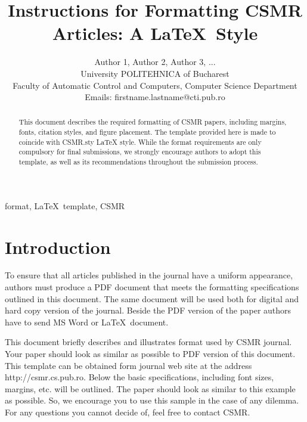 \documentclass[twoside, 11pt, a4paper]{article}
\begin{document}
\title{Instructions for Formatting CSMR Articles: A \LaTeX\ Style}

\author{\name Author 1, Author 2, Author 3, ...\\
       \addr University POLITEHNICA of Bucharest\\
       Faculty of Automatic Control and Computers, Computer Science Department\\
       \email Emails: firstname.lastname@cti.pub.ro}

\maketitle

\begin{abstract}
This document describes the required formatting of CSMR papers, including margins, fonts, citation styles, and figure placement. The template provided here is made to coincide with CSMR.sty LaTeX style. While the format requirements are only compulsory for final submissions, we strongly encourage authors to adopt this template, as well as its recommendations throughout the submission process.
\end{abstract}

\begin{keywords}
  format, \LaTeX\ template, CSMR
\end{keywords}

\section{Introduction}

To ensure that all articles published in the journal have a uniform appearance, authors must produce a PDF document that meets the formatting specifications outlined in this document. The same document will be used both for digital and hard copy version of the journal. Beside the PDF version of the paper authors have to send MS Word or \LaTeX\ document.

This document briefly describes and illustrates format used by CSMR journal. Your paper should look as similar as possible to PDF version of this document. This template can be obtained form journal web site at the address http://csmr.cs.pub.ro. Below the basic specifications, including font sizes, margins, etc. will be outlined. The paper should look as similar to this example as possible. So, we encourage you to use this sample in the case of any dilemma. For any questions you cannot decide of, feel free to contact CSMR.
\end{document}
